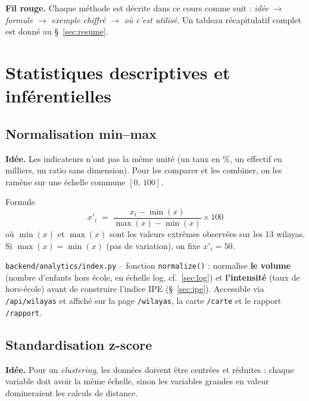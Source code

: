 \documentclass[11pt,a4paper]{article}
\newcommand{\txt}[1]{\texttt{#1}}
\begin{document}
\begin{notebox}
\textbf{Fil rouge.} Chaque méthode est décrite dans ce cours comme suit :
\emph{idée} $\to$ \emph{formule} $\to$ \emph{exemple chiffré} $\to$
\emph{où c'est utilisé}. Un tableau récapitulatif complet est donné au
§~\ref{sec:resume}.
\end{notebox}

\section{Statistiques descriptives et inférentielles}

\subsection{Normalisation min--max}
\label{sec:minmax}

\textbf{Idée.} Les indicateurs n'ont pas la même unité (un taux en \%, un
effectif en milliers, un ratio sans dimension). Pour les comparer et les
combiner, on les ramène sur une échelle commune $[0,\,100]$.

\begin{meth}{Formule}
\[
x'_i \;=\; \frac{x_i - \min(x)}{\max(x) - \min(x)} \times 100
\]
où $\min(x)$ et $\max(x)$ sont les valeurs extrêmes observées sur les
13 wilayas. Si $\max(x)=\min(x)$ (pas de variation), on fixe $x'_i=50$.
\end{meth}

\begin{where}
\txt{backend/analytics/index.py} -- fonction \txt{normalize()} : normalise
\textbf{le volume} (nombre d'enfants hors école, en échelle log, cf.~\ref{sec:log})
et \textbf{l'intensité} (taux de hors-école) avant de construire l'indice IPE
(§~\ref{sec:ipe}). Accessible via \txt{/api/wilayas} et affiché sur la page
\txt{/wilayas}, la carte \txt{/carte} et le rapport \txt{/rapport}.
\end{where}

\subsection{Standardisation z-score}
\label{sec:zscore}

\textbf{Idée.} Pour un \emph{clustering}, les données doivent être centrées et
réduites : chaque variable doit avoir la même échelle, sinon les variables
grandes en valeur domineraient les calculs de distance.
\end{document}

